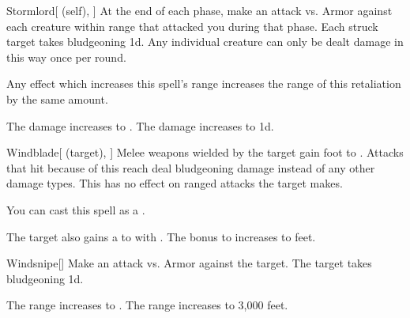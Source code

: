 \lowercase{\hypertarget{spell:Stormlord}{}}\label{spell:Stormlord}
\begin{attuneability}[Rank 3]{\hypertarget{spell:Stormlord}{Stormlord}}[ (self), ]
At the end of each phase, make an attack vs. Armor against each creature within \rngclose range that attacked you during that phase.
\hit Each struck target takes bludgeoning  \minus1d.
Any individual creature can only be dealt damage in this way once per round.

Any effect which increases this spell's range increases the range of this retaliation by the same amount.

\rankline
{} The damage increases to .
 The damage increases to  \plus1d.
\end{attuneability}
\vspace{0.25em}



\lowercase{\hypertarget{spell:Windblade}{}}\label{spell:Windblade}
\begin{attuneability}[Rank 3]{\hypertarget{spell:Windblade}{Windblade}}[ (target), ]
Melee weapons wielded by the target gain  foot  to .
Attacks that hit because of this reach deal bludgeoning damage instead of any other damage types.
This has no effect on ranged attacks the target makes.

You can cast this spell as a .

\rankline
{} The target also gains a   to  with .
 The bonus to  increases to  feet.
\end{attuneability}
\vspace{0.25em}



\lowercase{\hypertarget{spell:Windsnipe}{}}\label{spell:Windsnipe}
\begin{freeability}[Rank 3]{\hypertarget{spell:Windsnipe}{Windsnipe}}[]
Make an attack vs. Armor against the target.
\hit The target takes bludgeoning  \plus1d.

\rankline
{} The range increases to \rngext.
 The range increases to 3,000 feet.
\end{freeability}
\vspace{0.25em}



